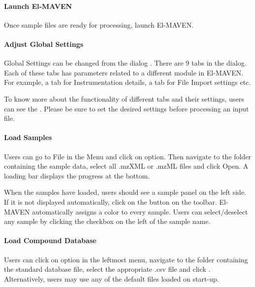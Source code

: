 \documentclass[letterpaper,10pt,english,openany,oneside]{sphinxmanual}
\begin{document}
\paragraph{Launch El-MAVEN}
\label{\detokenize{UnlabeledLCMSWorkflow:launch-el-maven}}
Once sample files are ready for processing, launch El-MAVEN.



\paragraph{Adjust Global Settings}
\label{\detokenize{UnlabeledLCMSWorkflow:adjust-global-settings}}
Global Settings can be changed from the  dialog . There are 9 tabs in the dialog. Each of these tabs has parameters related to a different module in El-MAVEN. For example, a tab for Instrumentation details, a tab for File Import settings etc.


To know more about the functionality of different tabs and their settings, users can see the . Please be sure to set the desired settings before processing an input file.


\paragraph{Load Samples}
\label{\detokenize{UnlabeledLCMSWorkflow:load-samples}}
Users can go to File in the Menu and click on  option. Then navigate to the folder containing the sample data, select all .mzXML or .mzML files and click Open. A loading bar displays the progress at the bottom.


When the samples have loaded, users should see a sample panel on the left side. If it is not displayed automatically, click on the  button on the toolbar. El-MAVEN automatically assigns a color to every sample. Users can select/deselect any sample by clicking the checkbox on the left of the sample name.



\paragraph{Load Compound Database}
\label{\detokenize{UnlabeledLCMSWorkflow:load-compound-database}}
Users can click on  option in the leftmost menu, navigate to the folder containing the standard database file, select the appropriate .csv file and click . Alternatively, users may use any of the default files loaded on start-up.
\end{document}
